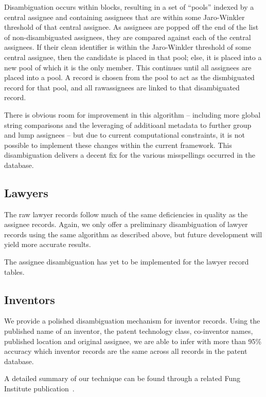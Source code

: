 Disambiguation occurs within blocks, resulting in a set of ``pools'' indexed by
a central assignee and containing assignees that are within some Jaro-Winkler
threshold of that central assignee. As assignees are popped off the end of the
list of non-disambiguated assignees, they are compared against each of the
central assignees. If their clean identifier is within the Jaro-Winkler
threshold of some central assignee, then the candidate is placed in that pool;
else, it is placed into a new pool of which it is the only member. This
continues until all assignees are placed into a pool. A record is chosen from
the pool to act as the dismbiguated record for that pool, and all rawassignees
are linked to that disambiguated record.

There is obvious room for improvement in this algorithm -- including more
global string comparisons and the leveraging of additioanl metadata to
further group and lump assignees -- but due to current computational
constraints, it is not possible to implement these changes within the current
framework. This disambiguation delivers a decent fix for the various misspellings
occurred in the database.

\subsection{Lawyers}

The raw lawyer records follow much of the same deficiencies in quality
as the assignee records. Again, we only offer a preliminary disambiguation
of lawyer records using the same algorithm as described above, but
future development will yield more accurate results.

The assignee disambiguation has yet to be implemented for the lawyer
record tables.

\subsection{Inventors}

We provide a polished disambiguation mechanism for inventor records.
Using the published name of an inventor, the patent technology class,
co-inventor names, published location and original assignee, we are
able to infer with more than 95\% accuracy which inventor records
are the same across all records in the patent database.

A detailed summary of our technique can be found through a related
Fung Institute publication~\cite{newdisambiguation}. 
